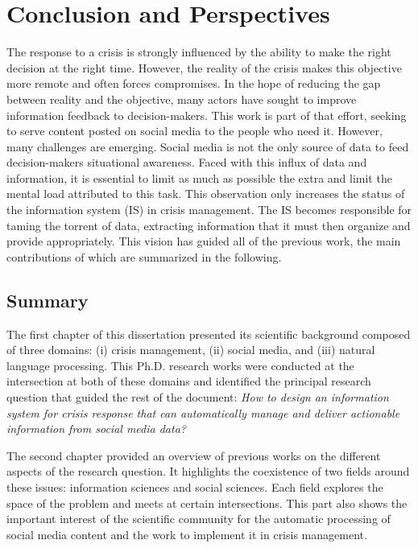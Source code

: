 \chapter*{Conclusion and Perspectives}

The response to a crisis is strongly influenced by the ability to make the right decision at the right time.
However, the reality of the crisis makes this objective more remote and often forces compromises.
In the hope of reducing the gap between reality and the objective, many actors have sought to improve information feedback to decision-makers.
This work is part of that effort, seeking to serve content posted on social media to the people who need it.
However, many challenges are emerging.
Social media is not the only source of data to feed decision-makers situational awareness.
Faced with this influx of data and information, it is essential to limit as much as possible the extra and limit the mental load attributed to this task.
This observation only increases the status of the information system (IS) in crisis management.
The IS becomes responsible for taming the torrent of data, extracting information that it must then organize and provide appropriately.
This vision has guided all of the previous work, the main contributions of which are summarized in the following.

\section{Summary}
The first chapter of this dissertation presented its scientific background composed of three domains: (i) crisis management, (ii) social media, and (iii) natural language processing.
This Ph.D. research works were conducted at the intersection at both of these domains and identified the principal research question that guided the rest of the document: \emph{How to design an information system for crisis response that can automatically manage and deliver actionable information from social media data?}

The second chapter provided an overview of previous works on the different aspects of the research question.
It highlights the coexistence of two fields around these issues: information sciences and social sciences. Each field explores the space of the problem and meets at certain intersections.
This part also shows the important interest of the scientific community for the automatic processing of social media content and the work to implement it in crisis management.

